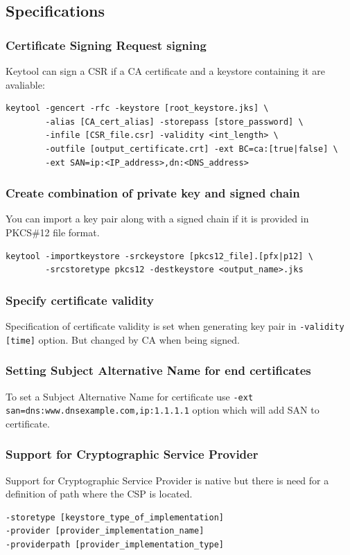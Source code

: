 \documentclass[10pt, a4paper]{report}
\begin{document}
  \subsection{Specifications}
  
    \subsubsection{Certificate Signing Request signing}
Keytool can sign a CSR if a CA certificate and a keystore containing it are avaliable:
\begin{verbatim}
keytool -gencert -rfc -keystore [root_keystore.jks] \
        -alias [CA_cert_alias] -storepass [store_password] \
        -infile [CSR_file.csr] -validity <int_length> \
        -outfile [output_certificate.crt] -ext BC=ca:[true|false] \
        -ext SAN=ip:<IP_address>,dn:<DNS_address> 
\end{verbatim}

    \subsubsection{Create combination of private key and signed chain}
You can import a key pair along with a signed chain if it is provided in PKCS\#12 file format.
\begin{verbatim}
keytool -importkeystore -srckeystore [pkcs12_file].[pfx|p12] \
        -srcstoretype pkcs12 -destkeystore <output_name>.jks
\end{verbatim}

    \subsubsection{Specify certificate validity}
Specification of certificate validity is set when generating key pair in \verb+-validity [time]+ option. But changed by CA when being signed.

    \subsubsection{Setting Subject Alternative Name for end certificates}
To set a Subject Alternative Name for certificate use \verb+-ext san=dns:www.dnsexample.com,ip:1.1.1.1+ option which will add SAN to certificate.

    \subsubsection{Support for Cryptographic Service Provider}
Support for Cryptographic Service Provider is native but there is need for a definition of path where the CSP is located.
\begin{verbatim}
-storetype [keystore_type_of_implementation]
-provider [provider_implementation_name]
-providerpath [provider_implementation_type]
\end{verbatim}
\end{document}
